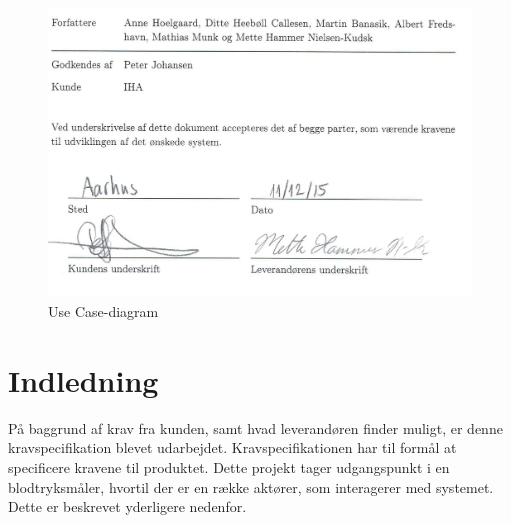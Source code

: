 

\begin{figure}[H]
	\centering
	\includegraphics[width=1.0\textwidth]{Figurer/underskriftGodkendt}
	\caption{Use Case-diagram}
	\label{fig:Use Cases}
\end{figure}


\newpage
\section{Indledning}
På baggrund af krav fra kunden, samt hvad leverandøren finder muligt, er denne kravspecifikation blevet udarbejdet. Kravspecifikationen har til formål at specificere kravene til produktet. Dette projekt tager udgangspunkt i en blodtryksmåler, hvortil der er en række aktører, som interagerer med systemet. Dette er beskrevet yderligere nedenfor.

